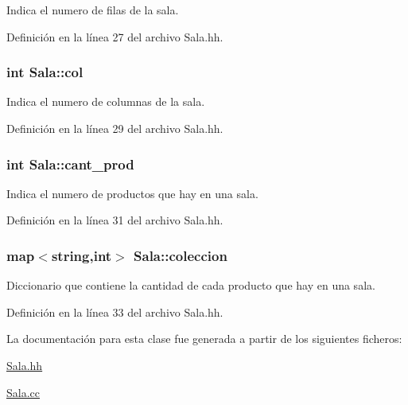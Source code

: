 Indica el numero de filas de la sala. 



Definición en la línea 27 del archivo Sala.\+hh.

\subsubsection[{\texorpdfstring{col}{col}}]{\setlength{\rightskip}{0pt plus 5cm}int Sala\+::col\hspace{0.3cm}{\ttfamily [private]}}\hypertarget{class_sala_a72a33e3787879e17844a904e19c6a4b4}{}\label{class_sala_a72a33e3787879e17844a904e19c6a4b4}


Indica el numero de columnas de la sala. 



Definición en la línea 29 del archivo Sala.\+hh.

\subsubsection[{\texorpdfstring{cant\+\_\+prod}{cant_prod}}]{\setlength{\rightskip}{0pt plus 5cm}int Sala\+::cant\+\_\+prod\hspace{0.3cm}{\ttfamily [private]}}\hypertarget{class_sala_aeb69af6cc00cfc97cfa4d18e1bd5e232}{}\label{class_sala_aeb69af6cc00cfc97cfa4d18e1bd5e232}


Indica el numero de productos que hay en una sala. 



Definición en la línea 31 del archivo Sala.\+hh.

\subsubsection[{\texorpdfstring{coleccion}{coleccion}}]{\setlength{\rightskip}{0pt plus 5cm}map$<$string,int$>$ Sala\+::coleccion\hspace{0.3cm}{\ttfamily [private]}}\hypertarget{class_sala_a1eea693397545de9c4750859bb58eae8}{}\label{class_sala_a1eea693397545de9c4750859bb58eae8}


Diccionario que contiene la cantidad de cada producto que hay en una sala. 



Definición en la línea 33 del archivo Sala.\+hh.



La documentación para esta clase fue generada a partir de los siguientes ficheros\+:\begin{DoxyCompactItemize}
\item 
\hyperlink{_sala_8hh}{Sala.\+hh}\item 
\hyperlink{_sala_8cc}{Sala.\+cc}\end{DoxyCompactItemize}
